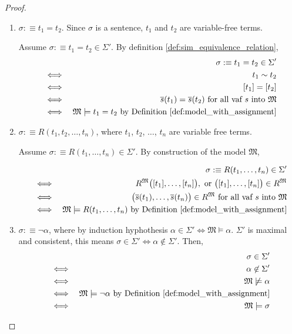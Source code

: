 \documentclass[11pt,letterpaper]{book}
\theoremstyle{definition}
\begin{document}
\begin{enumerate}
\begin{proof}
\begin{enumerate}
\item{$\sigma :\equiv t_1 = t_2$. Since $\sigma$ is a sentence, $t_1$
and $t_2$ are variable-free terms.

Assume $\sigma :\equiv t_1 = t_2 \in \Sigma'$. By definition
\ref{def:sim_equivalence_relation},
\begin{eqnarray*}
&  & \sigma :\equiv t_1 = t_2 \in \Sigma' \\
& \iff & t_1 \sim t_2 \\
& \iff & [t_1] = [t_2] \\
& \iff & \overline{s} (t_1) = \overline{s} (t_2) \text{ for all vaf $s$
into $\mathfrak{M}$} \\
& \iff & \mathfrak{M} \models t_1 = t_2 \text{ by Definition
\ref{def:model_with_assignment}}
\end{eqnarray*}
}

\item{$\sigma :\equiv R(t_1 , t_2 , \ldots , t_n )$, where $t_1$, $t_2$,
$\ldots$, $t_n$ are variable free terms.

Assume $\sigma :\equiv R(t_1, \ldots, t_n) \in \Sigma'$. By construction
of the model $\mathfrak{M}$,

\begin{eqnarray*}
& & \sigma :\equiv R(t_1, \ldots, t_n) \in \Sigma' \\
& \iff & R^{\mathfrak{M}} \big( [t_1], \ldots, [t_n] \big), \text{ or }
\big( [t_1], \ldots, [t_n] \big) \in R^{\mathfrak{M}} \\
& \iff & \big( \overline{s} (t_1), \ldots, \overline{s} (t_n) \big) \in
R^{\mathfrak{M}} \text{ for all vaf $s$ into $\mathfrak{M}$}  \\
& \iff & \mathfrak{M} \models R(t_1, \ldots, t_n)  \text{ by Definition
\ref{def:model_with_assignment}}
\end{eqnarray*}
}

\item{$\sigma :\equiv \lnot \alpha$, where by induction hyphothesis
$\alpha \in \Sigma' \iff \mathfrak{M} \models \alpha $. $\Sigma'$ is
maximal and consistent, this means $\sigma \in \Sigma' \iff \alpha \not
\in \Sigma'$. Then,
\begin{eqnarray*}
& & \sigma \in \Sigma' \\
& \iff & \alpha \not \in \Sigma' \\
& \iff & \mathfrak{M} \not \models \alpha \\
& \iff & \mathfrak{M} \models \lnot \alpha \text{ by Definition
\ref{def:model_with_assignment}} \\
& \iff & \mathfrak{M} \models \sigma
\end{eqnarray*}

}
\end{enumerate}
\end{proof}
\end{enumerate}
\end{document}
